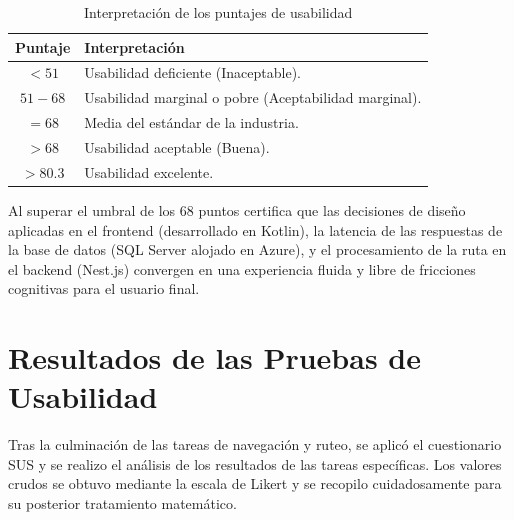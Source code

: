 \begin{table}[H]
\centering
\caption{Interpretación de los puntajes de usabilidad}
\begin{tabular}{|c|p{9cm}|}
\hline
\textbf{Puntaje} & \textbf{Interpretación} \\ \hline
$< 51$ & Usabilidad deficiente (Inaceptable). \\ \hline
$51 - 68$ & Usabilidad marginal o pobre (Aceptabilidad marginal). \\ \hline
$= 68$ & Media del estándar de la industria. \\ \hline
$> 68$ & Usabilidad aceptable (Buena). \\ \hline
$> 80.3$ & Usabilidad excelente. \\ \hline
\end{tabular}
\label{tab:usabilidad}
\end{table}

Al superar el umbral de los 68 puntos certifica que las decisiones de diseño aplicadas en el frontend (desarrollado en Kotlin), la latencia de las respuestas de la base de datos (SQL Server alojado en Azure), y el procesamiento de la ruta en el backend (Nest.js) convergen en una experiencia fluida y libre de fricciones cognitivas para el usuario final.

\section{Resultados de las Pruebas de Usabilidad}
Tras la culminación de las tareas de navegación y ruteo, se aplicó el cuestionario SUS y se realizo el análisis de los resultados de las tareas específicas. Los valores crudos se obtuvo mediante la escala de Likert y se recopilo cuidadosamente para su posterior tratamiento matemático.

